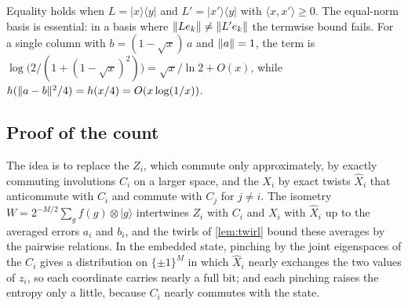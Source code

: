 Equality holds when $L=|x\rangle\langle y|$ and $L'=|x'\rangle\langle y|$ with $\langle x,x'\rangle\ge0$. The equal-norm basis is essential: in a basis where $\lVert Le_k\rVert\ne\lVert L'e_k\rVert$ the
termwise bound fails. For a single column with $b=(1-\sqrt x)\,a$ and $\lVert a\rVert=1$, the term is
$\log\bigl(2/(1+(1-\sqrt x)^2)\bigr)=\sqrt x/\ln2+O(x)$, while $h(\lVert a-b\rVert^2/4)=h(x/4)=O(x\log(1/x))$.

\subsection{Proof of the count}

The idea is to replace the $Z_i$, which commute only approximately, by exactly commuting involutions $C_i$ on a larger space, and the
$X_i$ by exact twists $\hat X_i$ that anticommute with $C_i$ and commute with $C_j$ for $j\ne i$. The isometry
$W=2^{-M/2}\sum_gf(g)\otimes|g\rangle$ intertwines $Z_i$ with $C_i$ and $X_i$ with $\hat X_i$ up to the averaged errors $a_i$ and $b_i$,
and the twirls of \cref{lem:twirl} bound these averages by the pairwise relations. In the embedded state, pinching by the joint
eigenspaces of the $C_i$ gives a distribution on $\{\pm1\}^M$ in which $\hat X_i$ nearly exchanges the two values of $z_i$, so each
coordinate carries nearly a full bit; and each pinching raises the entropy only a little, because $C_i$ nearly commutes with the state.

